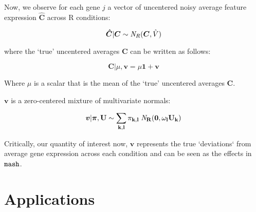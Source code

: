 \documentclass[11pt, oneside]{article}   	%
\newcommand{\ceff}{\bm{C}}
\newcommand{\chat}{\bm{\hat{C}}}
\newcommand{\vb}{\bm{v}}
\def\mash{{\tt mash}}
\begin{document}
Now, we observe for each gene $j$ a vector of uncentered noisy average feature expression $\chat$ across R conditions:

\begin{equation}
  \label{nobaselike}
\chat | \bm{\ceff} \sim {\it N}_R(\bm{\ceff}, \hat{V})
\end{equation}

where the `true' uncentered averages $\ceff$ can be written as follows:

\begin{equation}
  \label{uncenteredprior}
\ceff | \mu, \vb  = \mu \bm{1} + \vb
\end{equation}

Where $\mu$ is a scalar that is the mean of the `true' uncentered averages $\ceff$.

$\vb$ is a zero-centered mixture of multivariate normals:


 \begin{equation}
  \label{prior_v_mix}
  \vb | \bm{\pi},\bf{U} \sim \sum_{k,l} \pi_{k,l} \;{\it N}_R(\bm{0}, \omega_l U_{k})
\end{equation}

Critically, our quantity of interest now, $\vb$  represents the true `deviations` from average gene expression across each condition and can be seen as the effects in $\mash$.





\section{Applications}
\end{document}
